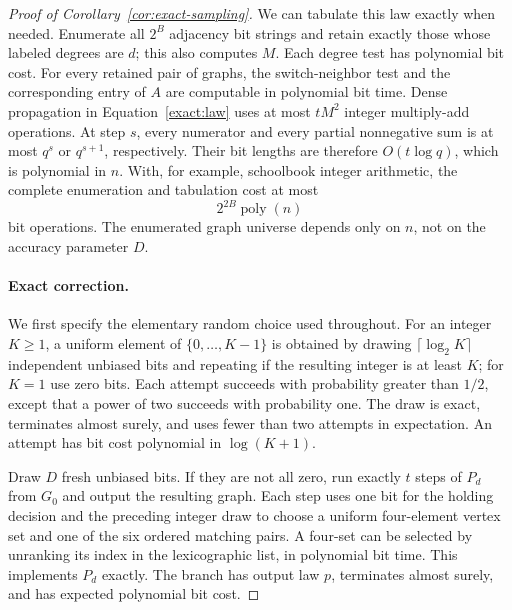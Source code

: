 \begin{proof}[Proof of Corollary~\ref{cor:exact-sampling}]
We can tabulate this law exactly when needed. Enumerate all $2^B$
adjacency bit strings and retain exactly those whose labeled degrees
are $d$; this also computes $M$. Each degree test has polynomial bit
cost. For every retained pair of graphs, the switch-neighbor test and
the corresponding entry of $A$ are computable in polynomial bit time.
Dense propagation in Equation~\eqref{exact:law} uses at most $tM^2$
integer multiply-add operations. At step $s$, every numerator and
every partial nonnegative sum is at most $q^s$ or $q^{s+1}$,
respectively. Their bit lengths are therefore $O(t\log q)$, which is
polynomial in $n$. With, for example, schoolbook integer arithmetic,
the complete enumeration and tabulation cost at most
\begin{equation}\label{exact:tabulation-cost}
 2^{2B}\operatorname{poly}(n)
\end{equation}
bit operations. The enumerated graph universe depends only on $n$,
not on the accuracy parameter $D$.

\paragraph{Exact correction.}
We first specify the elementary random choice used throughout.
For an integer $K\ge1$, a uniform element of $\{0,\ldots,K-1\}$ is
obtained by drawing $\lceil\log_2 K\rceil$ independent unbiased bits
and repeating if the resulting integer is at least $K$; for $K=1$
use zero bits. Each attempt succeeds with probability greater than
$1/2$, except that a power of two succeeds with probability one.
The draw is exact, terminates almost surely, and uses fewer than two
attempts in expectation. An attempt has bit cost polynomial in
$\log(K+1)$.

Draw $D$ fresh unbiased bits. If they are not all zero, run exactly
$t$ steps of $P_d$ from $G_0$ and output the resulting graph.
Each step uses one bit for the holding decision and the preceding
integer draw to choose a uniform four-element vertex set and one of
the six ordered matching pairs. A four-set can be selected by
unranking its index in the lexicographic list, in polynomial bit
time. This implements $P_d$ exactly. The branch has output law $p$,
terminates almost surely, and has expected polynomial bit cost.


\end{proof}
